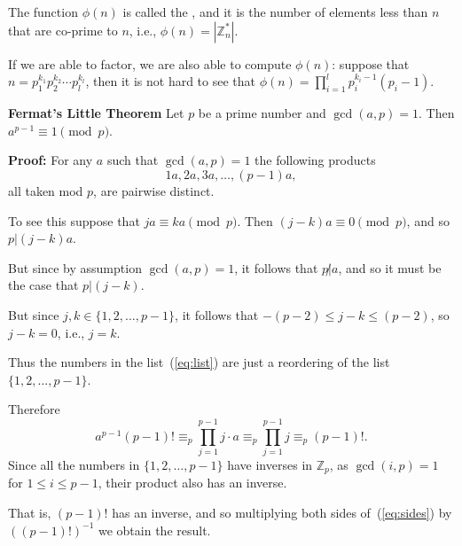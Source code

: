 \begin{frame}

The function $\phi(n)$ is called the , and
it is the number of elements less than $n$ that are co-prime to $n$,
i.e., $\phi(n)=|\mathbb{Z}_n^*|$.   

If we are able to factor, we are
also able to compute $\phi(n)$: suppose that
$n=p_1^{k_1}p_2^{k_2}\cdots p_l^{k_l}$, then it is not hard to see
that $\phi(n)=\prod_{i=1}^lp_i^{k_i-1}(p_i-1)$.

\end{frame}

\begin{frame}

{\bf Fermat's Little Theorem}
Let $p$ be a prime number and $\gcd(a,p)=1$.  Then $a^{p-1}\equiv
1\pmod p$.

{\bf Proof:}
For any $a$ such that $\gcd(a,p)=1$ the following products
\begin{equation}\label{eq:list}
1a,2a,3a,\ldots,(p-1)a,
\end{equation}
all taken mod $p$, are pairwise distinct.  

To see this suppose that
$ja\equiv ka\pmod p$.  Then $(j-k)a\equiv 0\pmod p$, and so
$p|(j-k)a$.  

But since by assumption $\gcd(a,p)=1$, it follows that
$p\not|a$, and so it must be the case that
$p|(j-k)$.  

But since $j,k\in\{1,2,\ldots,p-1\}$, it follows that
$-(p-2)\le j-k\le (p-2)$, so $j-k=0$, i.e., $j=k$.

\end{frame}

\begin{frame}

Thus the numbers in the list~(\ref{eq:list}) are just a reordering of
the list $\{1,2,\ldots,p-1\}$.  

Therefore
\begin{equation}\label{eq:sides}
a^{p-1}(p-1)!\equiv_p
\prod_{j=1}^{p-1}j\cdot a\equiv_p\prod_{j=1}^{p-1}j\equiv_p(p-1)!.
\end{equation}
Since all the numbers in $\{1,2,\ldots,p-1\}$ have inverses in
$\mathbb{Z}_p$, as $\gcd(i,p)=1$ for $1\le i\le p-1$, their product
also has an inverse.  

That is, $(p-1)!$ has an inverse, and so
multiplying both sides of~(\ref{eq:sides}) by $((p-1)!)^{-1}$ we
obtain the result.

\end{frame}

